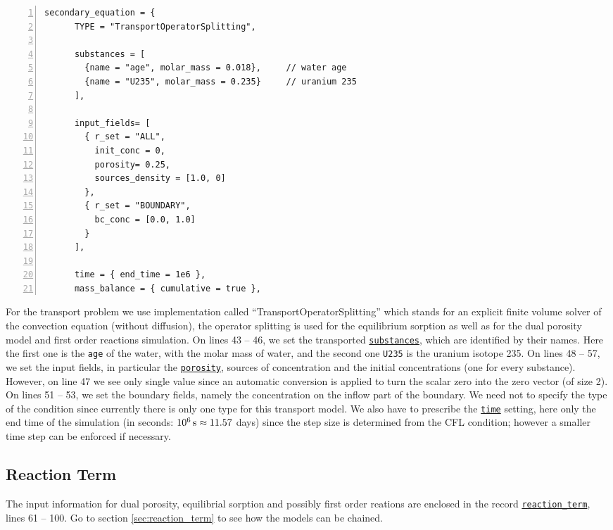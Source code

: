 \begin{Verbatim}[numbers=left, firstnumber=last]
    secondary_equation = {
      TYPE = "TransportOperatorSplitting", 

      substances = [ 
        {name = "age", molar_mass = 0.018},     // water age
        {name = "U235", molar_mass = 0.235}     // uranium 235
      ],
      
      input_fields= [
        { r_set = "ALL",
          init_conc = 0,
          porosity= 0.25,
          sources_density = [1.0, 0]
        },
        { r_set = "BOUNDARY",
          bc_conc = [0.0, 1.0]
        }
      ],
      
      time = { end_time = 1e6 },
      mass_balance = { cumulative = true },
\end{Verbatim}

For the transport problem we use implementation called ``TransportOperatorSplitting'' which stands for an explicit finite volume solver of the convection equation (without diffusion), 
the operator splitting is used for the equilibrium sorption as well as for the dual porosity model and first order reactions simulation.
On lines 43 -- 46, we set the transported \hyperlink{TransportOperatorSplitting::substances::B}{\tt substances}, which are identified by their names. 
Here the first one is the \verb'age' of the water, with the molar mass of water, and the second one \verb'U235' is the uranium isotope 235. 
On lines 48 -- 57, we set the input fields, in particular the \hyperlink{TransportOperatorSplitting-Data::porosity::B}{\tt porosity}, sources of concentration and the initial concentrations 
(one for every substance). However, on line 47 we see only single value since an automatic conversion is applied to turn the scalar zero into the zero vector (of size 2). 
On lines 51 -- 53, we set the boundary fields, namely the concentration on the inflow part of the boundary.
We need not to specify the type of the condition since currently there is only one type for this transport model.
We also have to prescribe the \hyperlink{IT::TimeGovernor}{\tt time} setting, here only the end time of the simulation
(in seconds: $10^6\,\rm{s}\approx 11.57$ days)
since the step size is determined from the CFL condition; however a smaller time step can be enforced if necessary.

\subsection{Reaction Term}\label{subsubsec:reactions}
The input information for dual porosity, equilibrial sorption and possibly first order reations are enclosed in the record 
\hyperlink{TransportOperatorSplitting::reaction-term::B}{\tt reaction\_term}, lines 61 -- 100. Go to section \ref{sec:reaction_term}
to see how the models can be chained.


